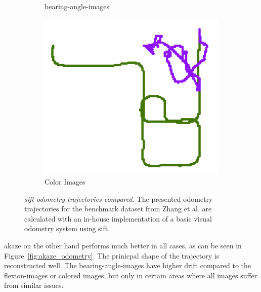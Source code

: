 \begin{figure}[htp]
\begin{subfigure}[c]{0.31\linewidth}
    \caption{\glspl{bearing-angle-image}}
\end{subfigure}%
\begin{subfigure}[c]{0.31\linewidth}
    \includegraphics[width=\linewidth]{chapter06/odo/zhang_pinhole_SIFT_nice.png}%
    \caption{Color Images}
\end{subfigure}
\caption[\acrshort{sift} odometry trajectories compared]{\emph{\acrshort{sift} odometry trajectories compared.} The presented odometry trajectories for the benchmark dataset from Zhang et al.\cite{zhang_icra2016} are calculated with an in-house implementation of a basic visual odometry system using \acrshort{sift}.}\label{fig:sift_odometry}
\end{figure}
\acrshort{akaze} on the other hand performs much better in all cases, as can be seen in Figure~\ref{fig:akaze_odometry}.
The prinicpal shape of the trajectory is reconstructed well.
The \glspl{bearing-angle-image} have higher drift compared to the \glspl{flexion-image} or colored images, but only in certain areas where all images suffer from similar issues.
